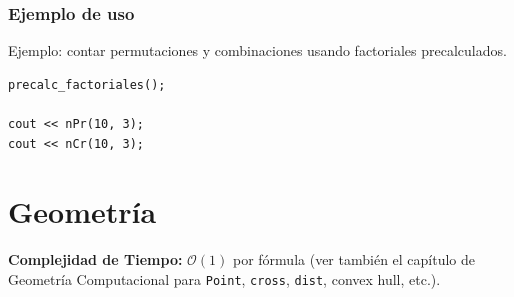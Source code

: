 \documentclass[10pt,twocolumn,letterpaper]{report}
\begin{document}
\subsubsection*{Ejemplo de uso}
Ejemplo: contar permutaciones y combinaciones usando factoriales precalculados.
\begin{lstlisting}
precalc_factoriales();

cout << nPr(10, 3);
cout << nCr(10, 3);
\end{lstlisting}


\section{Geometría}
\textbf{Complejidad de Tiempo:} $\mathcal{O}(1)$ por fórmula (ver también el capítulo de Geometría Computacional para \texttt{Point}, \texttt{cross}, \texttt{dist}, convex hull, etc.).
\end{document}

